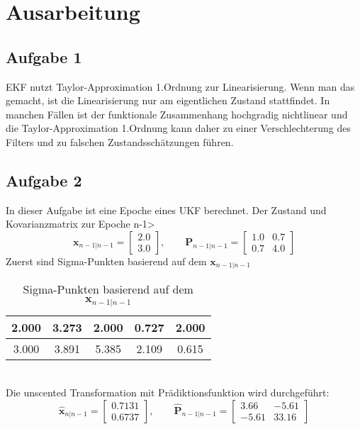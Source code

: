 \chapter{Ausarbeitung}
\section{Aufgabe 1}
EKF nutzt Taylor-Approximation 1.Ordnung zur Linearisierung. Wenn man das gemacht, ist die Linearisierung nur am eigentlichen Zustand stattfindet. In manchen Fällen ist der funktionale Zusammenhang hochgradig nichtlinear und die Taylor-Approximation 1.Ordnung kann daher zu einer Verschlechterung des Filters und zu falschen Zustandsschätzungen führen. 
\section{Aufgabe 2}
In dieser Aufgabe ist eine Epoche eines UKF berechnet. Der Zustand und Kovarianzmatrix zur Epoche n-1> 
\begin{equation*}
	\bm{x}_{n-1|n-1} = \begin{bmatrix}
		2.0\\
		3.0
	\end{bmatrix}, \qquad \bm{P}_{n-1|n-1} = \begin{bmatrix}
	1.0 & 0.7 \\
	0.7 & 4.0
\end{bmatrix}
\end{equation*}
Zuerst sind Sigma-Punkten basierend auf dem $\bm{x}_{n-1|n-1}$ 
\begin{table}[htpb]\centering
	\begin{tabular}{|c|c|c|c|c|}
	\hline
	2.000 &3.273 &2.000 &0.727 &2.000  \\ \hline 
	3.000 &3.891 &5.385 &2.109 &0.615  \\ \hline 
	\end{tabular}
	\caption{Sigma-Punkten basierend auf dem $\bm{x}_{n-1|n-1}$}
	\label{tab:pat}
\end{table}\\
Die unscented Transformation mit Prädiktionsfunktion wird durchgeführt:
\begin{equation*}
	\bm{\hat{x}}_{n|n-1} = \begin{bmatrix}
		0.7131\\
		0.6737
	\end{bmatrix}, \qquad \bm{\hat{P}}_{n-1|n-1} = \begin{bmatrix}
		3.66 & -5.61 \\
		-5.61 & 33.16
	\end{bmatrix}
\end{equation*}
